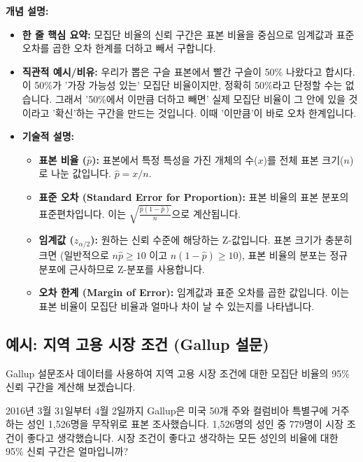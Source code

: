 \documentclass[11pt,a4paper]{article}
\begin{document}
\textbf{개념 설명:}
\begin{itemize}
    \item \textbf{한 줄 핵심 요약:} 모집단 비율의 신뢰 구간은 표본 비율을 중심으로 임계값과 표준 오차를 곱한 오차 한계를 더하고 빼서 구합니다.
    \item \textbf{직관적 예시/비유:} 우리가 뽑은 구슬 표본에서 빨간 구슬이 50\% 나왔다고 합시다. 이 50\%가 '가장 가능성 있는' 모집단 비율이지만, 정확히 50\%라고 단정할 수는 없습니다. 그래서 '50\%에서 이만큼 더하고 빼면' 실제 모집단 비율이 그 안에 있을 것이라고 '확신'하는 구간을 만드는 것입니다. 이때 '이만큼'이 바로 오차 한계입니다.
    \item \textbf{기술적 설명:}
        \begin{itemize}
            \item \textbf{표본 비율 ($\hat{p}$):} 표본에서 특정 특성을 가진 개체의 수($x$)를 전체 표본 크기($n$)로 나눈 값입니다. $\hat{p} = x/n$.
            \item \textbf{표준 오차 (Standard Error for Proportion):} 표본 비율의 표본 분포의 표준편차입니다. 이는 $\sqrt{\frac{\hat{p}(1-\hat{p})}{n}}$으로 계산됩니다.
            \item \textbf{임계값 ($z_{\alpha/2}$):} 원하는 신뢰 수준에 해당하는 Z-값입니다. 표본 크기가 충분히 크면 (일반적으로 $n\hat{p} \ge 10$ 이고 $n(1-\hat{p}) \ge 10$), 표본 비율의 분포는 정규 분포에 근사하므로 Z-분포를 사용합니다.
            \item \textbf{오차 한계 (Margin of Error):} 임계값과 표준 오차를 곱한 값입니다. 이는 표본 비율이 모집단 비율과 얼마나 차이 날 수 있는지를 나타냅니다.
        \end{itemize}
\end{itemize}

\subsection{예시: 지역 고용 시장 조건 (Gallup 설문)}

Gallup 설문조사 데이터를 사용하여 지역 고용 시장 조건에 대한 모집단 비율의 95\% 신뢰 구간을 계산해 보겠습니다.

\begin{tcolorbox}[title=슬라이드 70: 지역 고용 시장 조건이 좋은가? (1/2)]
2016년 3월 31일부터 4월 2일까지 Gallup은 미국 50개 주와 컬럼비아 특별구에 거주하는 성인 1,526명을 무작위로 표본 조사했습니다. 1,526명의 성인 중 779명이 시장 조건이 좋다고 생각했습니다.
시장 조건이 좋다고 생각하는 모든 성인의 비율에 대한 95\% 신뢰 구간은 얼마입니까?
\end{tcolorbox}
\end{document}
